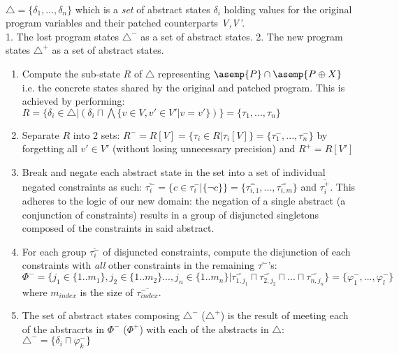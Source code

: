  \\
 $\triangle = \{\delta_1,...,\delta_n\}$ which is a \emph{set} of abstract states $\delta_i$ holding values for the original program variables and their patched counterparts \emph{V,V'}.\\
 1. The lost program states $\triangle^-$ as a set of abstract states. 2. The new program states $\triangle^+$ as a set of abstract states. \\
\begin{enumerate}
\item Compute the sub-state $R$ of $\triangle$ representing $\asemp{P} \cap \asemp{P\oplus X}$ i.e. the concrete states shared by the original and patched program. This is achieved by performing: $R = \{\delta_i \in \triangle | ( \delta_i \sqcap \bigwedge\{v \in V, v' \in V' | v = v'\} )\} = \{ \tau_1, ..., \tau_n \}$
\item Separate $R$ into 2 sets: $R^- = R[V] = \{\tau_i \in R | \tau_i[V] \} = \{ \tau_1^-,..., \tau_n^- \}$ by forgetting all  $v' \in V'$ (without losing unnecessary precision) and $R^+ = R[V']$
\item Break and negate each abstract state in the set into a set of individual negated constraints as such: $\overline{\tau_i^-} = \{ c \in \tau_i^- | \{\neg c\} \} = \{ \overline{\tau_{i,1}^-}, ... ,\overline{\tau_{i,m}^-} \}$ and $\overline{\tau_i^+}$. This adheres to the logic of our new domain: the negation of a single abstract (a conjunction of constraints) results in a group of disjuncted singletons composed of the constraints in said abstract.
\item For each group $\overline{\tau_i^-}$ of disjuncted constraints, compute the disjunction of each constraints with \emph{all} other constraints in the remaining $\overline{\tau^-}$'s:
$ \Phi^- = \{j_1 \in \{1..m_1\}, j_2 \in \{1..m_2\} ..., j_n \in \{1..m_n\} | \overline{\tau_{1,j_1}^-} \sqcap \overline{\tau_{2,j_2}^-} \sqcap ... \sqcap \overline{\tau_{n,j_n}^-} \} = \{ \varphi_1^-, ... ,\varphi_l^- \}$ where $m_{index}$ is the size of $\overline{\tau_{index}^-}$.
\item The set of abstract states composing $\triangle^-$ ($\triangle^+$) is the result of meeting each of the abstracrts in $\Phi^-$ ($\Phi^+$) with each of the abstracts in $\triangle$:\\
    $\triangle^- = \{ \delta_i \sqcap \varphi_k^- \}$
\end{enumerate}


